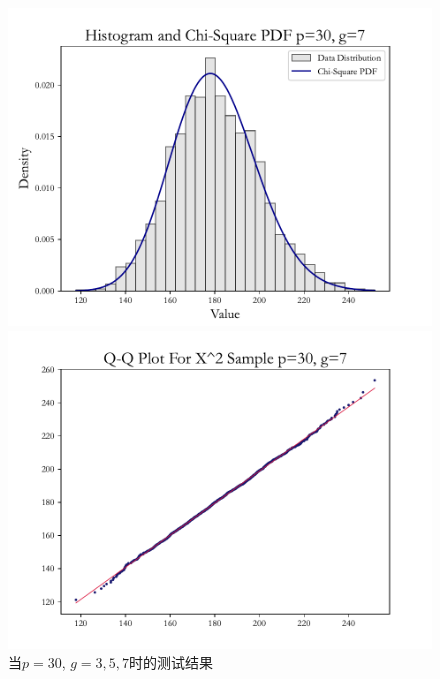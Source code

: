 \documentclass{article} %
\begin{document}
\begin{figure}[H]
\begin{minipage}[b]{0.49\textwidth}
        \includegraphics[width=\textwidth]{img/b/hist_plot_p=30_g=7.pdf}
    \end{minipage}
    \hfill
    \begin{minipage}[b]{0.49\textwidth}
        \centering
        \includegraphics[width=\textwidth]{img/b/qq_plot_p=30_g=7.pdf}
    \end{minipage}
    \caption{当\(p=30\), \(g=3,5,7\)时的测试结果}
    \label{fig:collection4}
\end{figure}
\end{document}
